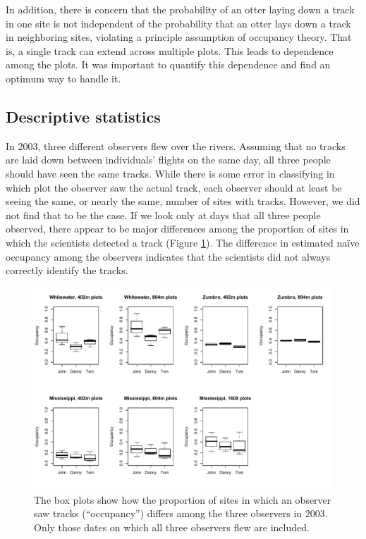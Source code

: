\documentclass[12pt]{article}
\begin{document}
    In addition, there is concern that the probability of an otter laying down a
    track in one site is not independent of the probability that an otter lays
    down a track in neighboring sites, violating a principle assumption of
    occupancy theory. That is, a single track can extend across multiple plots.
    This leads to dependence among the plots. It was important to quantify this
    dependence and find an optimum way to handle it.

    \subsection{Descriptive statistics}
    In 2003, three different observers flew over the rivers. Assuming that no
    tracks are laid down between individuals' flights on the same day, all three
    people should have seen the same tracks. While there is some error in
    classifying in which plot the observer saw the actual track, each observer
    should at least be seeing the same, or nearly the same, number of sites with
    tracks. However, we did not find that to be the case. If we look only at
    days that all three people observed, there appear to be major differences
    among the proportion of sites in which the scientists detected a track
    (Figure \ref{obsPlots}). The difference in estimated na\"ive occupancy among 
    the
    observers indicates that the scientists did not always correctly identify
    the tracks.

    \begin{figure}
        	\centering
	    \includegraphics[width=5in]{observerPlots.pdf}
	    \caption{The box plots show how the proportion of sites in which an 
	    observer saw tracks (``occupancy'') differs among the three observers in 
	    2003. Only those dates on which all three observers flew are included.}
	    \label{obsPlots}
    \end{figure}
\end{document}

